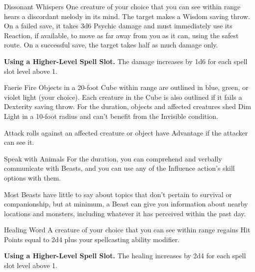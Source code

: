 \begin{Spell}[
    level=1st,
    time=1 Action,
    range=60 ft.,
    components={V},
    duration=Instantaneous,
    school=Enchantment,
    attack=WIS Save,
    effect=Psychic
]{Dissonant Whispers}
One creature of your choice that you can see within range hears a discordant melody in its mind. The target makes a Wisdom saving throw. On a failed save, it takes 3d6 Psychic damage and must immediately use its Reaction, if available, to move as far away from you as it can, using the safest route. On a successful save, the target takes half as much damage only.

\textbf{Using a Higher-Level Spell Slot.} The damage increases by 1d6 for each spell slot level above 1.
\end{Spell}


\begin{Spell}[
    tags=Concentration,
    level=1st,
    time=1 Action,
    range=60 ft. (20 ft. ),
    components={V},
    duration=1 Minute,
    school=Evocation,
    attack=DEX Save,
    effect=Debuff
]{Faerie Fire}
Objects in a 20-foot Cube within range are outlined in blue, green, or violet light (your choice). Each creature in the Cube is also outlined if it fails a Dexterity saving throw. For the duration, objects and affected creatures shed Dim Light in a 10-foot radius and can't benefit from the Invisible condition.

Attack rolls against an affected creature or object have Advantage if the attacker can see it.
\end{Spell}


\begin{Spell}[
    tags=Ritual,
    level=1st,
    time=1 Action,
    range=Self,
    components={V,S},
    duration=10 Minutes,
    school=Divination,
    attack=None,
    effect=Communication
]{Speak with Animals}
For the duration, you can comprehend and verbally communicate with Beasts, and you can use any of the Influence action's skill options with them.

Most Beasts have little to say about topics that don't pertain to survival or companionship, but at minimum, a Beast can give you information about nearby locations and monsters, including whatever it has perceived within the past day.
\end{Spell}


\begin{Spell}[
    level=1st,
    time=1 Bonus Action,
    range=60 ft.,
    components={V},
    duration=Instantaneous,
    school=Abjuration,
    attack=None,
    effect=Healing
]{Healing Word}
A creature of your choice that you can see within range regains Hit Points equal to 2d4 plus your spellcasting ability modifier.

\textbf{Using a Higher-Level Spell Slot.} The healing increases by 2d4 for each spell slot level above 1.
\end{Spell}

